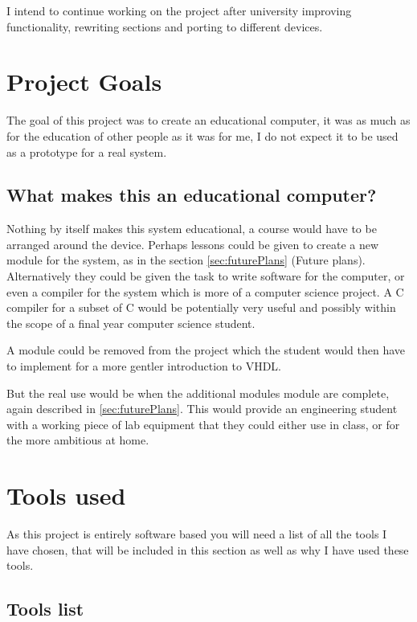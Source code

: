 \documentclass	[a4paper, 10pt]	{article}
\begin{document}
  I intend to continue working on the project after university improving functionality,
  rewriting sections and porting to different devices.

  \section{Project Goals}

  The goal of this project was to create an educational computer, it was as much as
  for the education of other people as it was for me, I do not expect it to be used
  as a prototype for a real system.

    \subsection{What makes this an educational computer?}

    Nothing by itself makes this system educational, a course would have to be
    arranged around the device. Perhaps lessons could be given to create a new module
    for the system, as in the section \ref{sec:futurePlans} (Future plans). Alternatively
    they could be given the task to write software for the computer, or even a compiler
    for the system which is more of a computer science project. A C compiler for a
    subset of C would be potentially very useful and possibly within the scope of
    a final year computer science student.

    A module could be removed from the project which the student would then have to
    implement for a more gentler introduction to VHDL. 

    But the real use would be when the additional modules module are complete, again
    described in \ref{sec:futurePlans}. This would provide an engineering student
    with a working piece of lab equipment that they could either use in class, or for
    the more ambitious at home.

  \section{Tools used}
  
  As this project is entirely software based you will need a list of all the tools
  I have chosen, that will be included in this section as well as why I have used
  these tools.

    \subsection{Tools list}
\end{document}
